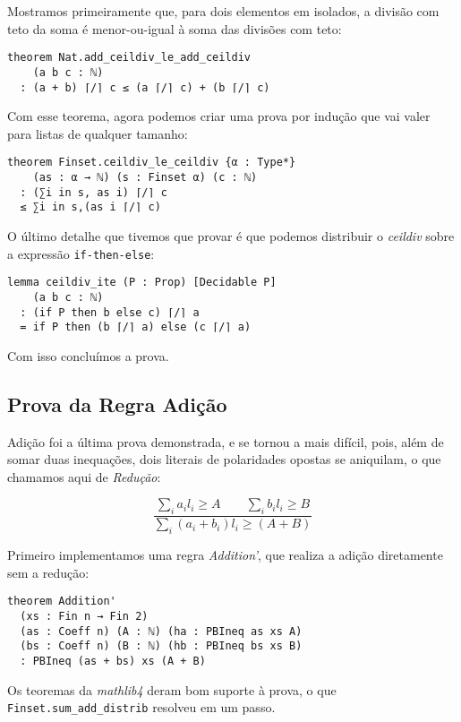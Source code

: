 \documentclass[conference]{IEEEtran}
\begin{document}
Mostramos primeiramente que, para dois elementos em isolados, a divisão com teto da soma é menor-ou-igual à soma das divisões com teto:
\begin{verbatim}
theorem Nat.add_ceildiv_le_add_ceildiv
    (a b c : ℕ)
  : (a + b) ⌈/⌉ c ≤ (a ⌈/⌉ c) + (b ⌈/⌉ c) 
\end{verbatim}

Com esse teorema, agora podemos criar uma prova por indução que vai valer para listas de qualquer tamanho:
\begin{verbatim}
theorem Finset.ceildiv_le_ceildiv {α : Type*}
    (as : α → ℕ) (s : Finset α) (c : ℕ)
  : (∑i in s, as i) ⌈/⌉ c
  ≤ ∑i in s,(as i ⌈/⌉ c)
\end{verbatim}

O último detalhe que tivemos que provar é que podemos distribuir o \textit{ceildiv} sobre a expressão \texttt{if-then-else}:
\begin{verbatim}
lemma ceildiv_ite (P : Prop) [Decidable P]
    (a b c : ℕ)
  : (if P then b else c) ⌈/⌉ a
  = if P then (b ⌈/⌉ a) else (c ⌈/⌉ a)
\end{verbatim}

Com isso concluímos a prova.



\subsection{Prova da Regra Adição}
Adição foi a última prova demonstrada, e se tornou a mais difícil, pois, além de somar duas inequações,
dois literais de polaridades opostas se aniquilam, o que chamamos aqui de \textit{Redução}:

\begin{equation}
    \frac
    {{\sum_i{a_i l_i} \ge A}\qquad {\sum_i{b_i l_i} \ge B}}
    {\sum_i{(a_i + b_i) l_i} \ge (A+B)}
\end{equation}

Primeiro implementamos uma regra \textit{Addition'}, que realiza a adição diretamente sem a redução:

\begin{verbatim}
theorem Addition'
  (xs : Fin n → Fin 2)
  (as : Coeff n) (A : ℕ) (ha : PBIneq as xs A)
  (bs : Coeff n) (B : ℕ) (hb : PBIneq bs xs B)
  : PBIneq (as + bs) xs (A + B)
\end{verbatim}

Os teoremas da \textit{mathlib4} deram bom suporte à prova, o que \texttt{Finset.sum\_add\_distrib} resolveu em um passo.
\end{document}
